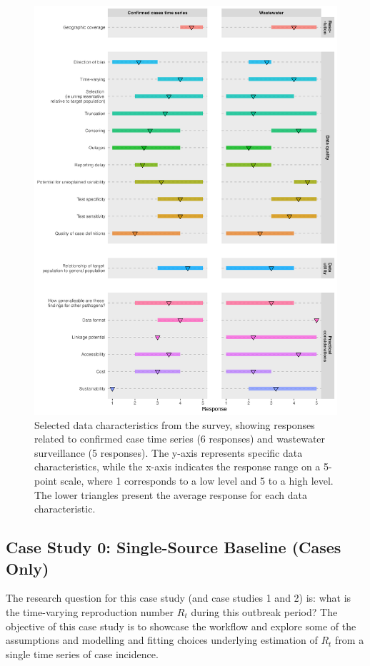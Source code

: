 \documentclass{article}
\begin{document}
%
\begin{figure}[H] 
\includegraphics[width=.97\linewidth]{figures/survey_responses.png}
\centering
\caption{ Selected data characteristics from the survey, showing responses related to confirmed case time series (6 responses) and wastewater surveillance (5 responses). The y-axis represents specific data characteristics, while the x-axis indicates the response range on a 5-point scale, where 1 corresponds to a low level and 5 to a high level. The lower triangles present the average response for each data characteristic.}
\label{survey_responses}
\end{figure}



\subsection{Case Study 0: Single-Source Baseline (Cases Only)}


The research question for this case study (and case studies 1 and 2) is: what is the time-varying reproduction number $R_t$ during this outbreak period?
The objective of this case study is to showcase the workflow and explore some of the assumptions and modelling and fitting choices underlying estimation of $R_t$ from a single time series of case incidence.
\end{document}
